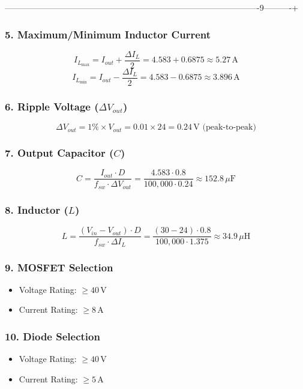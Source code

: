 -------------------------------------------------------------------------------------------9----------+\documentclass{article}
\begin{document}
\subsubsection*{5. Maximum/Minimum Inductor Current}
\[
I_{L_{\text{max}}} = I_{out} + \frac{\Delta I_L}{2} = 4.583 + 0.6875 \approx \boxed{5.27\, \text{A}}  
\]
\[
I_{L_{\text{min}}} = I_{out} - \frac{\Delta I_L}{2} = 4.583 - 0.6875 \approx \boxed{3.896\, \text{A}}
\]

\subsubsection*{6. Ripple Voltage (\( \Delta V_{out} \))}
\[
\Delta V_{out} = 1\% \times V_{out} = 0.01 \times 24 = \boxed{0.24\, \text{V (peak-to-peak)}}
\]

\subsubsection*{7. Output Capacitor (\( C \))}
\[
C = \frac{I_{out} \cdot D}{f_{sw} \cdot \Delta V_{out}} = \frac{4.583 \cdot 0.8}{100,000 \cdot 0.24} \approx \boxed{152.8\, \mu\text{F}}
\]

\subsubsection*{8. Inductor (\( L \))}
\[
L = \frac{(V_{in} - V_{out}) \cdot D}{f_{sw} \cdot \Delta I_L} = \frac{(30 - 24) \cdot 0.8}{100,000 \cdot 1.375} \approx \boxed{34.9\, \mu\text{H}}
\]

\subsubsection*{9. MOSFET Selection}
\begin{itemize}
    \item Voltage Rating: \( \geq 40\, \text{V} \)
    \item Current Rating: \( \geq 8\, \text{A} \)
\end{itemize}

\subsubsection*{10. Diode Selection}
\begin{itemize}
    \item Voltage Rating: \( \geq 40\, \text{V} \)
    \item Current Rating: \( \geq 5\, \text{A} \)
\end{itemize}
\end{document}
